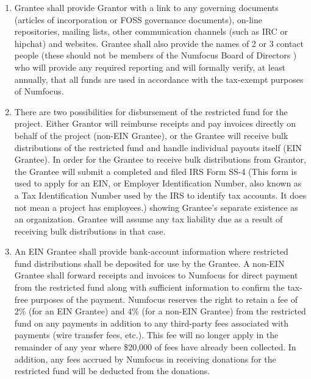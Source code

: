 \documentclass[english,letterpaper,12pt]{article}
\begin{document}
\begin{enumerate}[align=parleft]

\item Grantee shall provide Grantor with a link to any governing documents (articles of incorporation or FOSS governance documents), on-line repositories, mailing lists, other communication channels (such as IRC or hipchat) and websites.   Grantee shall also provide the names of 2 or 3 contact people (these should not be members of the Numfocus Board of Directors ) who will provide any required reporting and will formally verify, at least annually, that all funds are used in accordance with the tax-exempt purposes of Numfocus. 


\item There are two possibilities for disbursement of the restricted fund for the project.   Either Grantor will reimburse receipts and pay invoices directly on behalf of the project (non-EIN Grantee), or the Grantee will receive bulk distributions of the restricted fund and handle individual payouts itself (EIN Grantee).   In order for the Grantee to receive bulk distributions from Grantor, the Grantee will submit a completed and filed IRS Form SS-4 (This form is used to apply for an EIN, or Employer Identification Number, also known as a Tax Identification Number used by the IRS to identify tax accounts. It does not mean a project has employees.) showing Grantee's separate existence as an organization.   Grantee will assume any tax liability due as a result of receiving bulk distributions in that case. 

\item An EIN Grantee shall provide bank-account information where restricted fund distributions shall be deposited for use by the Grantee.  A non-EIN Grantee shall forward receipts and invoices to Numfocus for direct payment from the restricted fund along with sufficient information to confirm the tax-free purposes of the payment.   Numfocus reserves the right to retain a fee of 2\% (for an EIN Grantee) and 4\% (for a non-EIN Grantee) from the restricted fund on any payments in addition to any third-party fees associated with payments (wire transfer fees, etc.).  This fee will no longer apply in the remainder of any year where \$20,000 of fees have already been collected.   In addition, any fees accrued by Numfocus in receiving donations for the restricted fund will be deducted from the donations. 


\end{enumerate}
\end{document}
